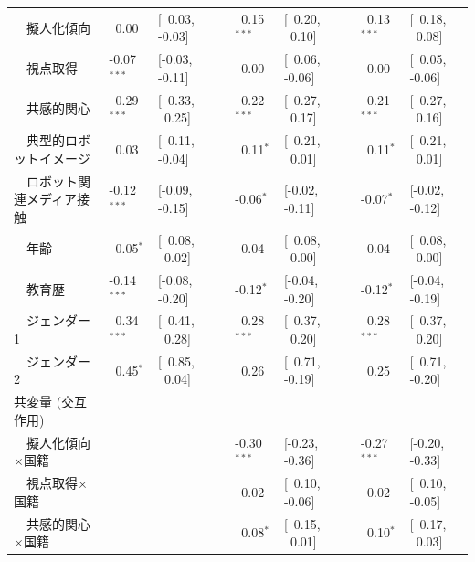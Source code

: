 \documentclass[a4j,12pt]{jreport}
\begin{document}
\begin{table}[]
{\begin{threeparttable}
\begin{tabular}{@{}lllllllll@{}}
~~擬人化傾向                & ~0.00         & {[}~0.03, -0.03{]}  &  & ~0.15$^{***}$      & {[}~0.20, ~0.10{]} &  & ~0.13$^{***}$      & {[}~0.18, ~0.08{]} \\
~~視点取得               & -0.07$^{***}$       & {[}-0.03, -0.11{]}   &  & ~0.00         & {[}~0.06, -0.06{]}  &  & ~0.00         & {[}~0.05, -0.06{]}  \\
~~共感的関心                & ~0.29$^{***}$      & {[}~0.33, ~0.25{]} &  & ~0.22$^{***}$      & {[}~0.27, ~0.17{]} &  & ~0.21$^{***}$      & {[}~0.27, ~0.16{]} \\
~~典型的ロボットイメージ                   & ~0.03         & {[}~0.11, -0.04{]}  &  & ~0.11$^*$ & {[}~0.21, ~0.01{]} &  & ~0.11$^*$ & {[}~0.21, ~0.01{]} \\
~~ロボット関連メディア接触 & -0.12$^{***}$       & {[}-0.09, -0.15{]}   &  & -0.06$^*$  & {[}-0.02, -0.11{]}   &  & -0.07$^*$  & {[}-0.02, -0.12{]}   \\
~~年齢                                  & ~0.05$^*$ & {[}~0.08, ~0.02{]} &  & ~0.04         & {[}~0.08, ~0.00{]} &  & ~0.04         & {[}~0.08, ~0.00{]} \\
~~教育歴                             & -0.14$^{***}$       & {[}-0.08, -0.20{]}   &  & -0.12$^*$  & {[}-0.04, -0.20{]}   &  & -0.12$^*$  & {[}-0.04, -0.19{]}   \\
~~ジェンダー1                               & ~0.34$^{***}$      & {[}~0.41, ~0.28{]} &  & ~0.28$^{***}$      & {[}~0.37, ~0.20{]} &  & ~0.28$^{***}$      & {[}~0.37, ~0.20{]} \\
~~ジェンダー2                               & ~0.45$^*$ & {[}~0.85, ~0.04{]} &  & ~0.26         & {[}~0.71, -0.19{]}  &  & ~0.25         & {[}~0.71, -0.20{]}  \\
共変量  (交互作用)                  &                &                      &  &                &                      &  &                &                      \\
~~擬人化傾向×国籍                               &                &                      &  & -0.30$^{***}$       & {[}-0.23, -0.36{]}   &  & -0.27$^{***}$       & {[}-0.20, -0.33{]}   \\
~~視点取得×国籍                                &                &                      &  & ~0.02         & {[}~0.10, -0.06{]}  &  & ~0.02         & {[}~0.10, -0.05{]}  \\
~~共感的関心×国籍                                 &                &                      &  & ~0.08$^*$ & {[}~0.15, ~0.01{]} &  & ~0.10$^*$ & {[}~0.17, ~0.03{]} \\

\end{tabular}
\end{threeparttable}}
\end{table}
\end{document}
